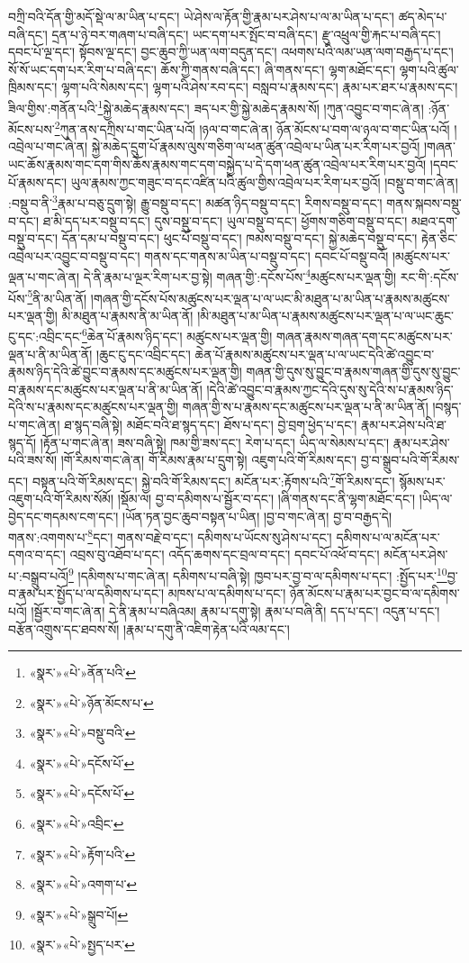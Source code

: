 བཀྲི་བའི་དོན་གྱི་མདོ་སྡེ་ལ་མ་ཡིན་པ་དང་། ཡེ་ཤེས་ལ་རྟོན་གྱི་རྣམ་པར་ཤེས་པ་ལ་མ་ཡིན་པ་དང་། ཚད་མེད་པ་བཞི་དང་། དྲན་པ་ཉེ་བར་གཞག་པ་བཞི་དང་། ཡང་དག་པར་སྤོང་བ་བཞི་དང་། རྫུ་འཕྲུལ་གྱི་རྐང་པ་བཞི་དང་། དབང་པོ་ལྔ་དང་། སྟོབས་ལྔ་དང་། བྱང་ཆུབ་ཀྱི་ཡན་ལག་བདུན་དང་། འཕགས་པའི་ལམ་ཡན་ལག་བརྒྱད་པ་དང་། སོ་སོ་ཡང་དག་པར་རིག་པ་བཞི་དང་། ཆོས་ཀྱི་གནས་བཞི་དང་། ཞི་གནས་དང་། ལྷག་མཐོང་དང་། ལྷག་པའི་ཚུལ་ཁྲིམས་དང་། ལྷག་པའི་སེམས་དང་། ལྷག་པའི་ཤེས་རབ་དང་། བསླབ་པ་རྣམས་དང་། རྣམ་པར་ཐར་པ་རྣམས་དང་། ཟིལ་གྱིས་:གནོན་པའི་\footnote{«སྣར་»«པེ་»ནོན་པའི་}སྐྱེ་མཆེད་རྣམས་དང་། ཟད་པར་གྱི་སྐྱེ་མཆེད་རྣམས་སོ། །ཀུན་འབྱུང་བ་གང་ཞེ་ན། :ཉོན་མོངས་པས་\footnote{«སྣར་»«པེ་»ཉོན་མོངས་པ་}ཀུན་ནས་དཀྲིས་པ་གང་ཡིན་པའོ། །ཉལ་བ་གང་ཞེ་ན། ཉོན་མོངས་པ་བག་ལ་ཉལ་བ་གང་ཡིན་པའོ། །འབྲེལ་པ་གང་ཞེ་ན། སྐྱེ་མཆེད་དྲུག་པོ་རྣམས་ལུས་གཅིག་ལ་ཕན་ཚུན་འབྲེལ་པ་ཡིན་པར་རིག་པར་བྱའོ། །གཞན་ཡང་ཆོས་རྣམས་གང་དག་གིས་ཆོས་རྣམས་གང་དག་བསྐྱེད་པ་དེ་དག་ཕན་ཚུན་འབྲེལ་པར་རིག་པར་བྱའོ། །དབང་པོ་རྣམས་དང་། ཡུལ་རྣམས་ཀྱང་གཟུང་བ་དང་འཛིན་པའི་ཚུལ་གྱིས་འབྲེལ་པར་རིག་པར་བྱའོ། །བསྡུ་བ་གང་ཞེ་ན། :བསྡུ་བ་ནི་\footnote{«སྣར་»«པེ་»བསྡུ་བའི་}རྣམ་པ་བཅུ་དྲུག་སྟེ། རྒྱུ་བསྡུ་བ་དང་། མཚན་ཉིད་བསྡུ་བ་དང་། རིགས་བསྡུ་བ་དང་། གནས་སྐབས་བསྡུ་བ་དང་། ཐ་མི་དད་པར་བསྡུ་བ་དང་། དུས་བསྡུ་བ་དང་། ཡུལ་བསྡུ་བ་དང་། ཕྱོགས་གཅིག་བསྡུ་བ་དང་། མཐའ་དག་བསྡུ་བ་དང་། དོན་དམ་པ་བསྡུ་བ་དང་། ཕུང་པོ་བསྡུ་བ་དང་། ཁམས་བསྡུ་བ་དང་། སྐྱེ་མཆེད་བསྡུ་བ་དང་། རྟེན་ཅིང་འབྲེལ་པར་འབྱུང་བ་བསྡུ་བ་དང་། གནས་དང་གནས་མ་ཡིན་པ་བསྡུ་བ་དང་། དབང་པོ་བསྡུ་བའོ། །མཚུངས་པར་ལྡན་པ་གང་ཞེ་ན། དེ་ནི་རྣམ་པ་ལྔར་རིག་པར་བྱ་སྟེ། གཞན་གྱི་:དངོས་པོས་\footnote{«སྣར་»«པེ་»དངོས་པོ་}མཚུངས་པར་ལྡན་གྱི། རང་གི་:དངོས་པོས་\footnote{«སྣར་»«པེ་»དངོས་པོ་}ནི་མ་ཡིན་ནོ། །གཞན་གྱི་དངོས་པོས་མཚུངས་པར་ལྡན་པ་ལ་ཡང་མི་མཐུན་པ་མ་ཡིན་པ་རྣམས་མཚུངས་པར་ལྡན་གྱི། མི་མཐུན་པ་རྣམས་ནི་མ་ཡིན་ནོ། །མི་མཐུན་པ་མ་ཡིན་པ་རྣམས་མཚུངས་པར་ལྡན་པ་ལ་ཡང་ཆུང་ངུ་དང་:འབྲིང་དང་\footnote{«སྣར་»«པེ་»འབྲིང་}ཆེན་པོ་རྣམས་ཉིད་དང་། མཚུངས་པར་ལྡན་གྱི། གཞན་རྣམས་གཞན་དག་དང་མཚུངས་པར་ལྡན་པ་ནི་མ་ཡིན་ནོ། །ཆུང་ངུ་དང་འབྲིང་དང་། ཆེན་པོ་རྣམས་མཚུངས་པར་ལྡན་པ་ལ་ཡང་དེའི་ཚེ་འབྱུང་བ་རྣམས་ཉིད་དེའི་ཚེ་བྱུང་བ་རྣམས་དང་མཚུངས་པར་ལྡན་གྱི། གཞན་གྱི་དུས་སུ་བྱུང་བ་རྣམས་གཞན་གྱི་དུས་སུ་བྱུང་བ་རྣམས་དང་མཚུངས་པར་ལྡན་པ་ནི་མ་ཡིན་ནོ། །དེའི་ཚེ་འབྱུང་བ་རྣམས་ཀྱང་དེའི་དུས་སུ་དེའི་ས་པ་རྣམས་ཉིད་དེའི་ས་པ་རྣམས་དང་མཚུངས་པར་ལྡན་གྱི། གཞན་གྱི་ས་པ་རྣམས་དང་མཚུངས་པར་ལྡན་པ་ནི་མ་ཡིན་ནོ། །བསྙད་པ་གང་ཞེ་ན། ཐ་སྙད་བཞི་སྟེ། མཐོང་བའི་ཐ་སྙད་དང་། ཐོས་པ་དང་། བྱེ་བྲག་ཕྱེད་པ་དང་། རྣམ་པར་ཤེས་པའི་ཐ་སྙད་དོ། །རྟོན་པ་གང་ཞེ་ན། ཟས་བཞི་སྟེ། ཁམ་གྱི་ཟས་དང་། རེག་པ་དང་། ཡིད་ལ་སེམས་པ་དང་། རྣམ་པར་ཤེས་པའི་ཟས་སོ། །གོ་རིམས་གང་ཞེ་ན། གོ་རིམས་རྣམ་པ་དྲུག་སྟེ། འཇུག་པའི་གོ་རིམས་དང་། བྱ་བ་སྒྲུབ་པའི་གོ་རིམས་དང་། བསྟན་པའི་གོ་རིམས་དང་། སྐྱེ་བའི་གོ་རིམས་དང་། མངོན་པར་:རྟོགས་པའི་\footnote{«སྣར་»«པེ་»རྟོག་པའི་}གོ་རིམས་དང་། སྙོམས་པར་འཇུག་པའི་གོ་རིམས་སོམོ། །སྡོམ་ལ། བྱ་བ་དམིགས་པ་སྦྱོར་བ་དང་། །ཞི་གནས་དང་ནི་ལྷག་མཐོང་དང་། །ཡིད་ལ་བྱེད་དང་གདམས་ངག་དང་། །ཡོན་ཏན་བྱང་ཆུབ་བསྟན་པ་ཡིན། །བྱ་བ་གང་ཞེ་ན། བྱ་བ་བརྒྱད་དེ། གནས་:འགགས་པ་\footnote{«སྣར་»«པེ་»འགག་པ་}དང་། གནས་བརྗེ་བ་དང་། དམིགས་པ་ཡོངས་སུ་ཤེས་པ་དང་། དམིགས་པ་ལ་མངོན་པར་དགའ་བ་དང་། འབྲས་བུ་འཐོབ་པ་དང་། འདོད་ཆགས་དང་བྲལ་བ་དང་། དབང་པོ་འཕོ་བ་དང་། མངོན་པར་ཤེས་པ་:བསྒྲུབ་པའོ།\footnote{«སྣར་»«པེ་»སྒྲུབ་པོ།} །དམིགས་པ་གང་ཞེ་ན། དམིགས་པ་བཞི་སྟེ། ཁྱབ་པར་བྱ་བ་ལ་དམིགས་པ་དང་། :སྤྱོད་པར་\footnote{«སྣར་»«པེ་»སྤྱད་པར་}བྱ་བ་རྣམ་པར་སྤྱོད་པ་ལ་དམིགས་པ་དང་། མཁས་པ་ལ་དམིགས་པ་དང་། ཉོན་མོངས་པ་རྣམ་པར་བྱང་བ་ལ་དམིགས་པའོ། །སྦྱོར་བ་གང་ཞེ་ན། དེ་ནི་རྣམ་པ་བཞིའམ། རྣམ་པ་དགུ་སྟེ། རྣམ་པ་བཞི་ནི། དད་པ་དང་། འདུན་པ་དང་། བརྩོན་འགྲུས་དང་ཐབས་སོ། །རྣམ་པ་དགུ་ནི་འཇིག་རྟེན་པའི་ལམ་དང་། 